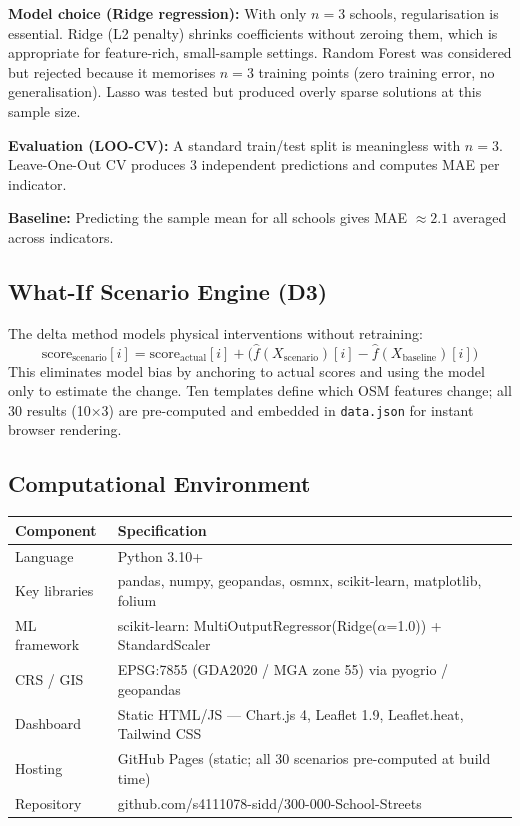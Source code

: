 \documentclass[11pt,a4paper]{article}
\begin{document}
\textbf{Model choice (Ridge regression):} With only $n=3$ schools, regularisation is essential. Ridge (L2 penalty) shrinks coefficients without zeroing them, which is appropriate for feature-rich, small-sample settings. Random Forest was considered but rejected because it memorises $n=3$ training points (zero training error, no generalisation). Lasso was tested but produced overly sparse solutions at this sample size.

\textbf{Evaluation (LOO-CV):} A standard train/test split is meaningless with $n=3$. Leave-One-Out CV produces 3 independent predictions and computes MAE per indicator.

\textbf{Baseline:} Predicting the sample mean for all schools gives MAE $\approx 2.1$ averaged across indicators.

\subsection{What-If Scenario Engine (D3)}
The delta method models physical interventions without retraining:
\[\text{score}_\text{scenario}[i] = \text{score}_\text{actual}[i] + \bigl(\hat{f}(X_\text{scenario})[i] - \hat{f}(X_\text{baseline})[i]\bigr)\]
This eliminates model bias by anchoring to actual scores and using the model only to estimate the change. Ten templates define which OSM features change; all 30 results (10$\times$3) are pre-computed and embedded in \texttt{data.json} for instant browser rendering.

\subsection{Computational Environment}

\begin{table}[H]\centering\small
\begin{tabular}{L{3.5cm}L{10cm}}
\toprule
\textbf{Component} & \textbf{Specification} \\
\midrule
Language & Python 3.10+ \\
Key libraries & pandas, numpy, geopandas, osmnx, scikit-learn, matplotlib, folium \\
ML framework & scikit-learn: MultiOutputRegressor(Ridge($\alpha$=1.0)) + StandardScaler \\
CRS / GIS & EPSG:7855 (GDA2020 / MGA zone 55) via pyogrio / geopandas \\
Dashboard & Static HTML/JS — Chart.js 4, Leaflet 1.9, Leaflet.heat, Tailwind CSS \\
Hosting & GitHub Pages (static; all 30 scenarios pre-computed at build time) \\
Repository & github.com/s4111078-sidd/300-000-School-Streets \\
\bottomrule
\end{tabular}
\end{table}
\end{document}
